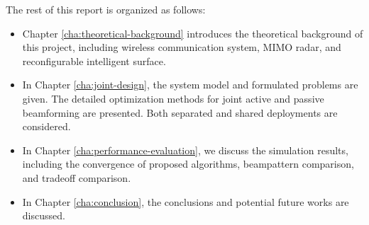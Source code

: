 The rest of this report is organized as follows:
\begin{itemize}
    \item Chapter \ref{cha:theoretical-background} introduces the theoretical background of this project, including wireless communication system, MIMO radar, and reconfigurable intelligent surface.
    \item In Chapter \ref{cha:joint-design}, the system model and formulated problems are given. The detailed optimization methods for joint active and passive beamforming are presented. Both separated and shared deployments are considered.
    \item In Chapter \ref{cha:performance-evaluation}, we discuss the simulation results, including the convergence of proposed algorithms, beampattern comparison, and tradeoff comparison.
    \item In Chapter \ref{cha:conclusion}, the conclusions and potential future works are discussed.
\end{itemize}
